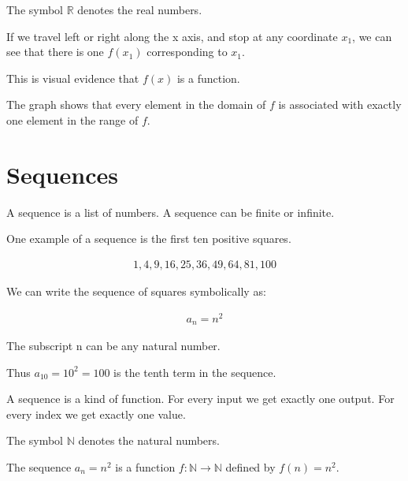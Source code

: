 \documentclass{article}
\begin{document}
\begin{flushleft}
The symbol $\mathbb{R}$ denotes the real numbers.
\end{flushleft}
\begin{flushleft}
If we travel left or right along the x axis, and stop at any coordinate $x_{1}$, we can see that there is one $f(x_{1})$ corresponding to $x_{1}$.
\end{flushleft}
\begin{flushleft}
This is visual evidence that $f(x)$ is a function.
\end{flushleft}
\begin{flushleft}
The graph shows that every element in the domain of $f$ is associated with exactly one element in the range of $f$.
\end{flushleft}
\section{Sequences}
\begin{flushleft}
A sequence is a list of numbers. A sequence can be finite or infinite.
\end{flushleft}
\begin{flushleft}
One example of a sequence is the first ten positive squares.
\end{flushleft}
\begin{align*}
1, 4, 9, 16, 25, 36, 49, 64, 81, 100
\end{align*}
\begin{flushleft}
We can write the sequence of squares symbolically as:
\end{flushleft}
\begin{align*}
a_{n} = n^2 
\end{align*}
\begin{flushleft}
The subscript n can be any natural number. 
\end{flushleft}
\begin{flushleft}
Thus $a_{10} = 10^2 = 100$ is the tenth term in the sequence.
\end{flushleft}
\begin{flushleft}
A sequence is a kind of function. For every input we get exactly one output. For every index we get exactly one value.
\end{flushleft}
\begin{flushleft}
The symbol $\mathbb{N}$ denotes the natural numbers.
\end{flushleft}
\begin{flushleft}
The sequence $a_{n} = n^2$ is a function $f : \mathbb{N} \rightarrow \mathbb{N}$ defined by $f(n) = n^2$.
\end{flushleft}
\end{document}
